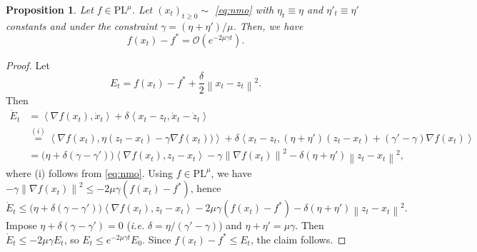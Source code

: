 \documentclass{article}
\def\xcont{(x_t)_{t\ge 0}}
\def\pl{{\text{PL}^\mu}}
\newcommand{\norm}[1]{\left\lVert#1\right\rVert}
\newcommand{\dotprod}[1]{\left< #1\right>}
\newcommand{\grad}[1]{\nabla f(#1)}
\newcommand{\bigO}{\mathcal{O}}
\theoremstyle{plain}
\newtheorem{proposition}[theorem]{Proposition}
\theoremstyle{definition}
\theoremstyle{remark}
\begin{document}
\begin{proposition}\label{prop:nmo_pl}
Let $f \in \pl$. Let $\xcont \sim$ \eqref{eq:nmo} with $\eta_t\equiv \eta$ and $\eta'_t\equiv \eta'$ constants and under the constraint $\gamma = (\eta+\eta')/\mu$. Then, we have
\[
f(x_t)-f^\ast = \bigO(e^{-2\mu \gamma t}).
\]
\end{proposition}
\begin{proof}
Let
\[
E_t = f(x_t)-f^\ast + \frac{\delta}{2}\norm{x_t - z_t}^2.
\]
Then
\begin{align*}
\dot{E}_t
&= \dotprod{\grad{x_t}, \dot{x}_t} + \delta \dotprod{x_t - z_t,\dot{x}_t - \dot{z}_t}\\
&\overset{(i)}=
\dotprod{\grad{x_t},  \eta(z_t-x_t) - \gamma \grad{x_t)}}
+ \delta \dotprod{x_t - z_t, (\eta+\eta')(z_t-x_t) + (\gamma'-\gamma)\grad{x_t}}\\
&=
\bigl(\eta+\delta(\gamma-\gamma')\bigr)\dotprod{\grad{x_t},  z_t-x_t}
- \gamma \norm{\grad{x_t}}^2
- \delta(\eta + \eta')\norm{z_t-x_t}^2,
\end{align*}
where (i) follows from \eqref{eq:nmo}.
Using $f\in\pl$, we have $-\gamma \norm{\grad{x_t}}^2 \le -2\mu\gamma (f(x_t)-f^\ast)$, hence
\[
\dot E_t \le
\bigl(\eta+\delta(\gamma-\gamma')\bigr)\dotprod{\grad{x_t},  z_t-x_t}
-2\mu\gamma (f(x_t)-f^\ast)
- \delta(\eta + \eta')\norm{z_t-x_t}^2.
\]
Impose $\eta+\delta(\gamma-\gamma')=0$ (\textit{i.e.} $\delta=\eta/(\gamma'-\gamma)$) and $\eta+\eta'=\mu\gamma$.
Then $\dot E_t \le -2\mu\gamma E_t$, so $E_t \le e^{-2\mu\gamma t}E_0$.
Since $f(x_t)-f^\ast \le E_t$, the claim follows.
\end{proof}
\end{document}
